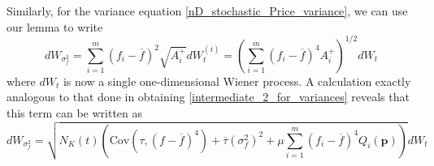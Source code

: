 Similarly, for the variance equation \eqref{nD_stochastic_Price_variance}, we can use our lemma to write
\begin{equation}
dW_{\sigma^2_f} = \sum\limits_{i=1}^{m}\left(f_i - \overline{f}\right)^2\sqrt{A_i^+}dW_{t}^{(i)} = \left(\sum\limits_{i=1}^{m}\left(f_i - \overline{f}\right)^4 A_i^+\right)^{1/2}dW_t
\end{equation}
where $dW_t$ is now a single one-dimensional Wiener process. A calculation exactly analogous to that done in obtaining \eqref{intermediate_2_for_variances} reveals that this term can be written as
\begin{equation}
	\label{nD_stoch_variance_Price_noise_term_alt_representation}
	dW_{\sigma^2_f} = \sqrt{N_K(t) \left(\textrm{Cov}(\tau,\left(f - \overline{f}\right)^4) + \overline{\tau}(\sigma^2_{f})^2 +\mu \sum\limits_{i=1}^{m}\left(f_i - \overline{f}\right)^4Q_i(\mathbf{p})\right)}dW_t
\end{equation}